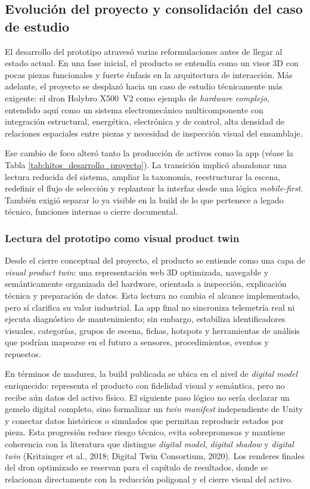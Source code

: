 \subsection{Evolución del proyecto y consolidación del caso de estudio}

El desarrollo del prototipo atravesó varias reformulaciones antes de llegar al estado actual. En una fase inicial, el producto se entendía como un visor 3D con pocas piezas funcionales y fuerte énfasis en la arquitectura de interacción. Más adelante, el proyecto se desplazó hacia un caso de estudio técnicamente más exigente: el dron Holybro X500~V2 como ejemplo de \textit{hardware complejo}, entendido aquí como un sistema electromecánico multicomponente con integración estructural, energética, electrónica y de control, alta densidad de relaciones espaciales entre piezas y necesidad de inspección visual del ensamblaje.

Ese cambio de foco alteró tanto la producción de activos como la app (véase la Tabla \ref{tab:hitos_desarrollo_proyecto}). La transición implicó abandonar una lectura reducida del sistema, ampliar la taxonomía, reestructurar la escena, redefinir el flujo de selección y replantear la interfaz desde una lógica \textit{mobile-first}. También exigió separar lo ya visible en la build de lo que pertenece a legado técnico, funciones internas o cierre documental.

\subsubsection{Lectura del prototipo como visual product twin}

Desde el cierre conceptual del proyecto, el producto se entiende como una capa de \textit{visual product twin}: una representación web 3D optimizada, navegable y semánticamente organizada del hardware, orientada a inspección, explicación técnica y preparación de datos. Esta lectura no cambia el alcance implementado, pero sí clarifica su valor industrial. La app final no sincroniza telemetría real ni ejecuta diagnóstico de mantenimiento; sin embargo, estabiliza identificadores visuales, categorías, grupos de escena, fichas, hotspots y herramientas de análisis que podrían mapearse en el futuro a sensores, procedimientos, eventos y repuestos.

En términos de madurez, la build publicada se ubica en el nivel de \textit{digital model} enriquecido: representa el producto con fidelidad visual y semántica, pero no recibe aún datos del activo físico. El siguiente paso lógico no sería declarar un gemelo digital completo, sino formalizar un \textit{twin manifest} independiente de Unity y conectar datos históricos o simulados que permitan reproducir estados por pieza. Esta progresión reduce riesgo técnico, evita sobrepromesas y mantiene coherencia con la literatura que distingue \textit{digital model}, \textit{digital shadow} y \textit{digital twin} (Kritzinger et al., 2018; Digital Twin Consortium, 2020). Los renderes finales del dron optimizado se reservan para el capítulo de resultados, donde se relacionan directamente con la reducción poligonal y el cierre visual del activo.

